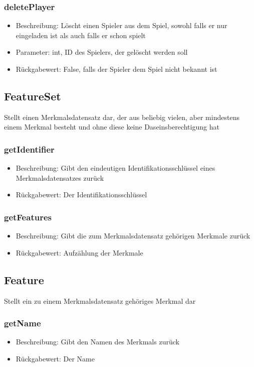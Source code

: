 \documentclass[a4paper]{scrreprt}
\begin{document}
   \subsubsection{deletePlayer}
      \begin{itemize}
      \item Beschreibung: Löscht einen Spieler aus dem Spiel, sowohl falls er nur eingeladen ist als auch falls er schon spielt
      \item Parameter: int, ID des Spielers, der gelöscht werden soll
      \item Rückgabewert: False, falls der Spieler dem Spiel nicht bekannt ist
      \end{itemize}
      
   \subsection{FeatureSet}
   Stellt einen Merkmalsdatensatz dar, der aus beliebig vielen, aber mindestens einem Merkmal besteht und ohne diese keine Daseinsberechtigung hat
   \subsubsection{getIdentifier}
   \begin{itemize}
      \item Beschreibung: Gibt den eindeutigen Identifikationsschlüssel eines Merkmalsdatensatzes zurück
      \item Rückgabewert: Der Identifikationsschlüssel
   \end{itemize}
   \subsubsection{getFeatures}
      \begin{itemize}
         \item Beschreibung: Gibt die zum Merkmalsdatensatz gehörigen Merkmale zurück
         \item Rückgabewert: Aufzählung der Merkmale
      \end{itemize}
   
   \subsection{Feature}
   Stellt ein zu einem Merkmalsdatensatz gehöriges Merkmal dar
   \subsubsection{getName}
      \begin{itemize}
          \item Beschreibung: Gibt den Namen des Merkmals zurück
          \item Rückgabewert: Der Name
      \end{itemize}
\end{document}

